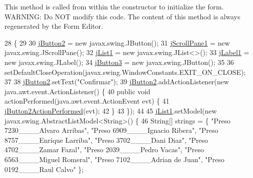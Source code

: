 This method is called from within the constructor to initialize the form. W\+A\+R\+N\+I\+NG\+: Do N\+OT modify this code. The content of this method is always regenerated by the Form Editor. 
\begin{DoxyCode}
28                                   \{
29 
30         \mbox{\hyperlink{classinterfacessoguar_1_1paenrilarriconboxex_ada9e272c25f98b59277bf1cc3d87e89d}{jButton2}} = \textcolor{keyword}{new} javax.swing.JButton();
31         \mbox{\hyperlink{classinterfacessoguar_1_1paenrilarriconboxex_a37efb18a476b6d2b02f2181ef12a7bf7}{jScrollPane1}} = \textcolor{keyword}{new} javax.swing.JScrollPane();
32         \mbox{\hyperlink{classinterfacessoguar_1_1paenrilarriconboxex_aafe6499bef73e1ae5162f2909227f93d}{jList1}} = \textcolor{keyword}{new} javax.swing.JList<>();
33         \mbox{\hyperlink{classinterfacessoguar_1_1paenrilarriconboxex_a183fb515416e9f28b873f438feb9bd96}{jLabel1}} = \textcolor{keyword}{new} javax.swing.JLabel();
34         \mbox{\hyperlink{classinterfacessoguar_1_1paenrilarriconboxex_ab9e110160eea74109e1ac28fcf342a44}{jButton3}} = \textcolor{keyword}{new} javax.swing.JButton();
35 
36         setDefaultCloseOperation(javax.swing.WindowConstants.EXIT\_ON\_CLOSE);
37 
38         \mbox{\hyperlink{classinterfacessoguar_1_1paenrilarriconboxex_ada9e272c25f98b59277bf1cc3d87e89d}{jButton2}}.setText(\textcolor{stringliteral}{"Confirmar"});
39         \mbox{\hyperlink{classinterfacessoguar_1_1paenrilarriconboxex_ada9e272c25f98b59277bf1cc3d87e89d}{jButton2}}.addActionListener(\textcolor{keyword}{new} java.awt.event.ActionListener() \{
40             \textcolor{keyword}{public} \textcolor{keywordtype}{void} actionPerformed(java.awt.event.ActionEvent evt) \{
41                 \mbox{\hyperlink{classinterfacessoguar_1_1paenrilarriconboxex_ad3d3c77ffada02753ef8c9de4432c0ad}{jButton2ActionPerformed}}(evt);
42             \}
43         \});
44 
45         \mbox{\hyperlink{classinterfacessoguar_1_1paenrilarriconboxex_aafe6499bef73e1ae5162f2909227f93d}{jList1}}.setModel(\textcolor{keyword}{new} javax.swing.AbstractListModel<String>() \{
46             String[] strings = \{ \textcolor{stringliteral}{"Preso 7230\_\_\_\_Alvaro Arribas"}, \textcolor{stringliteral}{"Preso 6909\_\_\_\_Ignacio Ribera"}, \textcolor{stringliteral}{"Preso
       8757\_\_\_\_Enrique Larriba"}, \textcolor{stringliteral}{"Preso 3702\_\_\_\_Dani Diaz"}, \textcolor{stringliteral}{"Preso 4702\_\_\_\_Zamar Fazal"}, \textcolor{stringliteral}{"Preso 2039\_\_\_\_Pedro Vacas"}, \textcolor{stringliteral}{
      "Preso 6563\_\_\_\_Miguel Romeral"}, \textcolor{stringliteral}{"Preso 7102\_\_\_\_Adrian de Juan"}, \textcolor{stringliteral}{"Preso 0192\_\_\_\_Raul Calvo"} \};

\end{DoxyCode}

